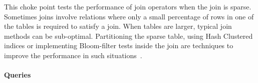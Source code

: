 
This choke point tests the performance of join operators when the join is
sparse. Sometimes joins involve relations where only a small percentage of rows
in one of the tables is required to satisfy a join. When tables are larger,
typical join methods can be sub-optimal. Partitioning the sparse table, using
Hash Clustered indices or implementing Bloom-filter tests inside the join are
techniques to improve the performance in such
situations~\cite{DBLP:journals/csur/Graefe93}.


\paragraph{Queries}
{\raggedright
}